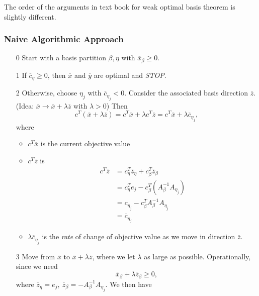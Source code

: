 \begin{note}
	The order of the arguments in text book for weak optimal basis theorem is slightly different.
\end{note}

\subsubsection{Naive Algorithmic Approach}
\begin{enumerate}
	\item[0] Start with a basis partition \(\beta, \eta\) with \(\overline{x}_{\beta}\geq 0\).
	\item[1] If \(\overline{c}_{\eta}\geq 0\), then \(\overline{x}\) and \(\overline{y}\) are optimal and \emph{STOP}.
	\item[2] Otherwise, choose \(\eta_j	\) with \(\overline{c}_{\eta_j}<0\). Consider the associated basis direction \(\overline{z}\).(Idea: \(\overline{x}\to \overline{x}+\lambda \overline{z}\) with \(\lambda >0\)) Then
		\[
			c^{T}(\overline{x} + \lambda \overline{z}) = c^{T} \overline{x} + \lambda c^{T} \overline{z} = c^{T} \overline{x} + \lambda \overline{c}_{\eta_j},
		\]
		where \begin{itemize}
			\item \(c^{T} \overline{x}\) is the current objective value
			\item \(c^{T}\overline{z}\) is
			      \[
				      \begin{split}
					      c^{T}\overline{z} &= c_{\eta}^{T} \overline{z}_{\eta}+c_{\beta}^{T} \overline{z}_{\beta}\\
					      &=c_{\eta}^{T}e_{j} - c_{\beta}^{T}(A^{-1}_{\beta}A_{\eta_j})\\
					      &=c_{\eta_{j}} - c_{\beta}^{T} A^{-1}_{\beta}A_{\eta_j}\\
					      &= \overline{c}_{\eta_{j}}
				      \end{split}
			      \]
			\item \(\lambda \overline{c}_{\eta_{j}}\) is the \emph{rate} of change of objective value as we move in direction \(\overline{z}\).
		\end{itemize}
	\item[3] Move from \(\overline{x}\) to \(\overline{x}+\overline{\lambda} \overline{z}\), where we let \(\overline{\lambda}\) as large as possible. Operationally, since we need
		\[
			\overline{x}_{\beta} + \lambda \overline{z}_{\beta} \geq 0,
		\]
		where \(\overline{z}_{\eta} = e_{j},\ \overline{z}_{\beta} = -A^{-1}_{\beta}A_{\eta_{j}}\). We then have

\end{enumerate}
